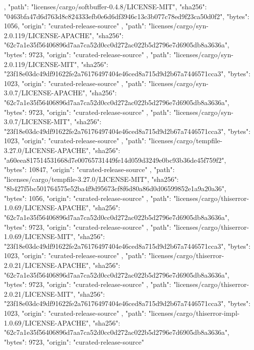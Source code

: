 {{    },
    {
      "path": "licenses/cargo/softbuffer-0.4.8/LICENSE-MIT",
      "sha256": "0463bfa47d6d763d8c824333efb0e6d6df3946c13c3b077c78ed9f23ca50d0f2",
      "bytes": 1056,
      "origin": "curated-release-source"
    },
    {
      "path": "licenses/cargo/syn-2.0.119/LICENSE-APACHE",
      "sha256": "62c7a1e35f56406896d7aa7ca52d0cc0d272ac022b5d2796e7d6905db8a3636a",
      "bytes": 9723,
      "origin": "curated-release-source"
    },
    {
      "path": "licenses/cargo/syn-2.0.119/LICENSE-MIT",
      "sha256": "23f18e03dc49df91622fe2a76176497404e46ced8a715d9d2b67a7446571cca3",
      "bytes": 1023,
      "origin": "curated-release-source"
    },
    {
      "path": "licenses/cargo/syn-3.0.7/LICENSE-APACHE",
      "sha256": "62c7a1e35f56406896d7aa7ca52d0cc0d272ac022b5d2796e7d6905db8a3636a",
      "bytes": 9723,
      "origin": "curated-release-source"
    },
    {
      "path": "licenses/cargo/syn-3.0.7/LICENSE-MIT",
      "sha256": "23f18e03dc49df91622fe2a76176497404e46ced8a715d9d2b67a7446571cca3",
      "bytes": 1023,
      "origin": "curated-release-source"
    },
    {
      "path": "licenses/cargo/tempfile-3.27.0/LICENSE-APACHE",
      "sha256": "a60eea817514531668d7e00765731449fe14d059d3249e0bc93b36de45f759f2",
      "bytes": 10847,
      "origin": "curated-release-source"
    },
    {
      "path": "licenses/cargo/tempfile-3.27.0/LICENSE-MIT",
      "sha256": "8b427f5bc501764575e52ba4f9d95673cf8f6d80a86d0d06599852e1a9a20a36",
      "bytes": 1056,
      "origin": "curated-release-source"
    },
    {
      "path": "licenses/cargo/thiserror-1.0.69/LICENSE-APACHE",
      "sha256": "62c7a1e35f56406896d7aa7ca52d0cc0d272ac022b5d2796e7d6905db8a3636a",
      "bytes": 9723,
      "origin": "curated-release-source"
    },
    {
      "path": "licenses/cargo/thiserror-1.0.69/LICENSE-MIT",
      "sha256": "23f18e03dc49df91622fe2a76176497404e46ced8a715d9d2b67a7446571cca3",
      "bytes": 1023,
      "origin": "curated-release-source"
    },
    {
      "path": "licenses/cargo/thiserror-2.0.21/LICENSE-APACHE",
      "sha256": "62c7a1e35f56406896d7aa7ca52d0cc0d272ac022b5d2796e7d6905db8a3636a",
      "bytes": 9723,
      "origin": "curated-release-source"
    },
    {
      "path": "licenses/cargo/thiserror-2.0.21/LICENSE-MIT",
      "sha256": "23f18e03dc49df91622fe2a76176497404e46ced8a715d9d2b67a7446571cca3",
      "bytes": 1023,
      "origin": "curated-release-source"
    },
    {
      "path": "licenses/cargo/thiserror-impl-1.0.69/LICENSE-APACHE",
      "sha256": "62c7a1e35f56406896d7aa7ca52d0cc0d272ac022b5d2796e7d6905db8a3636a",
      "bytes": 9723,
      "origin": "curated-release-source"
}}
